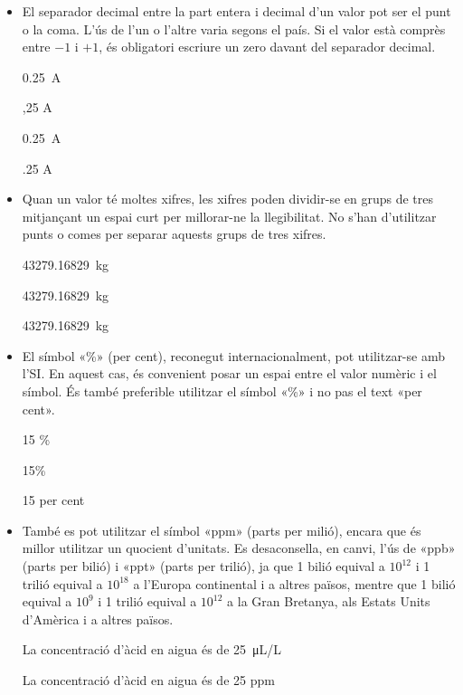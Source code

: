 \begin{itemize}
\textcolor{Green}\faCheckSquare{} $U\ped{DC} =\qty{24}{V}$

\textcolor{Red}\faTimesCircle{} $U = \qty{24}{VDC}$

\textcolor{Green}\faCheckSquare{}  $I\ped{max} = \qty{36}{kA}$

\textcolor{Red}\faTimesCircle{}   $I = \qty{36}{kA\ped{max}}$


\item El separador decimal entre la part entera i decimal d'un valor pot ser el punt o la coma. L'ús de l'un o l'altre varia segons el país. Si el valor està comprès entre $-1$ i $+1$, és obligatori escriure un zero davant del separador decimal.

\textcolor{Green}\faCheckSquare{} \qty{0,25}{A}

\textcolor{Red}\faTimesCircle{}  ,25 A

\textcolor{Green}\faCheckSquare{} \qty[output-decimal-marker = {.}]{0.25}{A}

\textcolor{Red}\faTimesCircle{}  .25 A


\item Quan un valor té moltes xifres, les xifres poden dividir-se en grups de tres mitjançant un espai curt per millorar-ne la llegibilitat. No s'han d'utilitzar punts o comes per separar aquests grups de tres xifres.

\textcolor{Green}\faCheckSquare{} \qty{43279,16829}{kg}

\textcolor{Green}\faCheckSquare{} \qty[group-separator =]{43279,16829}{kg}

\textcolor{Red}\faTimesCircle{}  \qty[group-separator = .]{43279,16829}{kg}

\item El símbol «\%» (per cent), reconegut internacionalment, pot utilitzar-se amb l'SI. En aquest cas, és convenient posar un espai entre el valor numèric i el símbol. És també preferible utilitzar el símbol «\%» i no pas el text  «per cent».

\textcolor{Green}\faCheckSquare{} 15 \%

\textcolor{Blue}\faExclamationTriangle{} 15\%

\textcolor{Blue}\faExclamationTriangle{} 15 per cent


\item També es pot utilitzar el símbol «ppm» (parts per milió), encara que és millor utilitzar un quocient d'unitats. Es desaconsella, en canvi, l'ús de «ppb» (parts per bilió) i «ppt» (parts per trilió), ja que 1 bilió equival a $10^{12}$ i 1 trilió equival a $10^{18}$ a l'Europa continental i a altres països, mentre que 1 bilió equival a $10^{9}$ i 1 trilió equival a $10^{12}$ a la Gran Bretanya, als Estats Units d'Amèrica i a altres països.

\textcolor{Green}\faCheckSquare{} La concentració d'àcid en aigua és de \qty{25}{\micro L/L}

\textcolor{Blue}\faExclamationTriangle{} La concentració d'àcid en aigua és de 25 ppm

\end{itemize}


